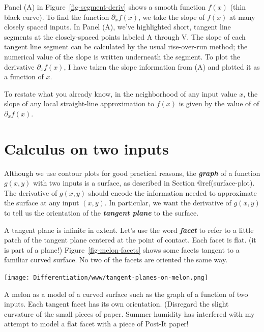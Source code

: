\documentclass[
  letterpaper,
  DIV=11,
  numbers=noendperiod,
  oneside]{scrreprt}
\begin{document}
Panel (A) in Figure~\ref{fig-segment-deriv} shows a smooth function
\(f(x)\) (thin black curve). To find the function \(\partial_x f(x)\),
we take the slope of \(f(x)\) at many closely spaced inputs. In Panel
(A), we've highlighted short, tangent line segments at the
closely-spaced points labeled A through V. The slope of each tangent
line segment can be calculated by the usual rise-over-run method; the
numerical value of the slope is written underneath the segment. To plot
the derivative \(\partial_x f(x)\), I have taken the slope information
from (A) and plotted it as a function of \(x\).

To restate what you already know, in the neighborhood of any input value
\(x\), the slope of any local straight-line approximation to \(f(x)\) is
given by the value of of \(\partial_x f(x)\).

\hypertarget{calculus-on-two-inputs}{%
\section{Calculus on two inputs}\label{calculus-on-two-inputs}}

Although we use contour plots for good practical reasons, the
\textbf{\emph{graph}} of a function \(g(x,y)\) with two inputs is a
surface, as described in Section @ref(surface-plot). The derivative of
\(g(x,y)\) should encode the information needed to approximate the
surface at any input \((x,y)\). In particular, we want the derivative of
\(g(x,y)\) to tell us the orientation of the \textbf{\emph{tangent
plane}} to the surface.

A tangent plane is infinite in extent. Let's use the word
\textbf{\emph{facet}} to refer to a little patch of the tangent plane
centered at the point of contact. Each facet is flat. (it is part of a
plane!) Figure~\ref{fig-melon-facets} shows some facets tangent to a
familiar curved surface. No two of the facets are oriented the same way.

\begin{marginfigure}

{\centering \texttt{[image: Differentiation/www/tangent-planes-on-melon.png]}

}

\caption{\label{fig-melon-facets}A melon as a model of a curved surface
such as the graph of a function of two inputs. Each tangent facet has
its own orientation. (Disregard the slight curvature of the small pieces
of paper. Summer humidity has interfered with my attempt to model a flat
facet with a piece of Post-It paper!}

\end{marginfigure}
\end{document}
